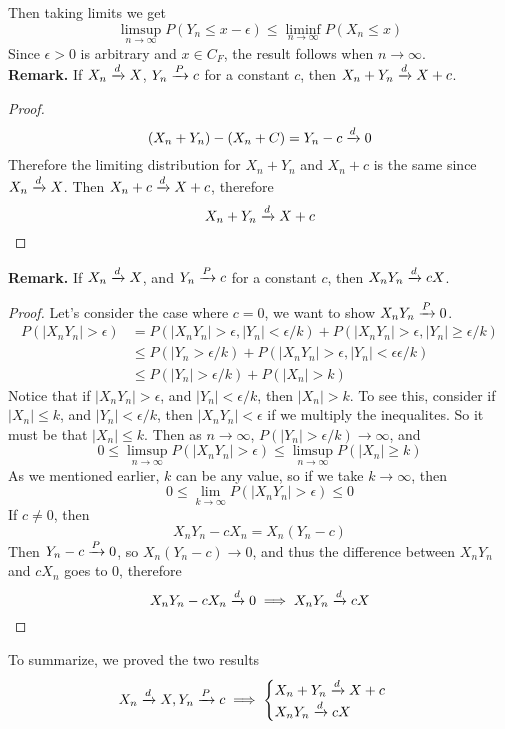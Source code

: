 \documentclass[openany]{report}
\begin{document}
Then taking limits we get
\[\limsup_{n\rightarrow\infty} P(Y_n \leq x- \epsilon) \leq \liminf_{n\rightarrow \infty} P(X_n \leq x)\]
Since $\epsilon > 0$ is arbitrary and $x \in C_F$, the result follows when $n\rightarrow \infty$. \\[2ex]
\textbf{Remark.} If $X_n \xrightarrow{d} X$, $Y_n \xrightarrow{P} c$ for a constant $c$, then $X_n + Y_n \xrightarrow{d} X + c$. 
\begin{proof}
    \[(X_n+Y_n)-(X_n + C) = Y_n - c \xrightarrow{d} 0\]
    Therefore the limiting distribution for $X_n + Y_n$ and $X_n + c$ is the same since $X_n \xrightarrow{d} X$. Then $X_n + c \xrightarrow{d} X + c$, therefore 
    \[X_n + Y_n \xrightarrow{d} X + c\]
\end{proof}
\textbf{Remark.} If $X_n \xrightarrow{d} X$, and $Y_n \xrightarrow{P} c$ for a constant $c$, then $X_nY_n \xrightarrow{d} cX$. 
\begin{proof}
    Let's consider the case where $c = 0$, we want to show $X_nY_n \xrightarrow{P} 0$.
    \begin{align*} 
        P(|X_nY_n| > \epsilon) &= P(|X_nY_n| > \epsilon, |Y_n| < \epsilon/k) + P(|X_nY_n| > \epsilon, |Y_n| \geq \epsilon/k)\\
        &\leq P(|Y_n > \epsilon/k) + P(|X_nY_n| > \epsilon, |Y_n| < \epsilon \epsilon/k)\\
        &\leq P(|Y_n| >  \epsilon/k) + P(|X_n| > k)
    \end{align*}
    Notice that if $|X_nY_n| > \epsilon$, and $|Y_n| < \epsilon/k$, then $|X_n| > k$. To see this, consider if $|X_n| \leq k$, and $|Y_n| < \epsilon/k$, then $|X_nY_n| < \epsilon$ if we multiply the inequalites. So it must be that $|X_n| \leq k$. Then as $n\rightarrow \infty$, $P(|Y_n| > \epsilon/k) \rightarrow \infty$, and 
    \[0 \leq \limsup_{n\rightarrow\infty} P(|X_nY_n| > \epsilon) \leq \limsup_{n\rightarrow\infty} P(|X_n| \geq k)\]
    As we mentioned earlier, $k$ can be any value, so if we take $k \rightarrow \infty$, then 
    \[0 \leq \lim_{k\rightarrow\infty} P(|X_nY_n| > \epsilon) \leq 0\]
    If $c \neq 0$, then 
    \[X_nY_n - cX_n = X_n(Y_n - c)\]
    Then $Y_n - c \xrightarrow{P} 0$, so $X_n(Y_n-c) \rightarrow 0$, and thus the difference between $X_nY_n$ and $cX_n$ goes to 0, therefore 
    \[X_nY_n - cX_n \xrightarrow{d} 0 \implies X_nY_n \xrightarrow{d} cX\]
\end{proof} 
To summarize, we proved the two results 
\[X_n \xrightarrow{d} X, Y_n \xrightarrow{P} c \implies \begin{cases}
    X_n + Y_n \xrightarrow{d} X + c\\
    X_nY_n \xrightarrow{d} cX
\end{cases} \]
\end{document}

